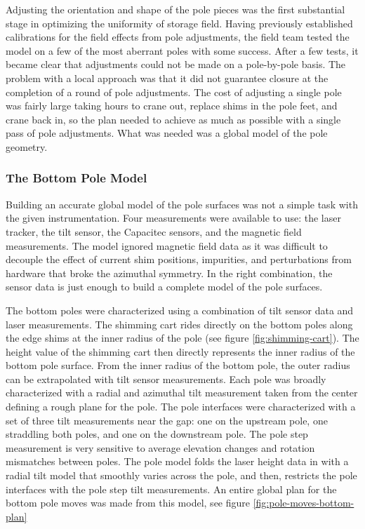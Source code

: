 Adjusting the orientation and shape of the pole pieces was the first substantial stage in optimizing the uniformity of \gmtwo storage field.  Having previously established calibrations for the field effects from pole adjustments, the \gmtwo field team tested the model on a few of the most aberrant poles with some success.  After a few tests, it became clear that adjustments could not be made on a pole-by-pole basis.  The problem with a local approach was that it did not guarantee closure at the completion of a round of pole adjustments.  The cost of adjusting a single pole was fairly large taking hours to crane out, replace shims in the pole feet, and crane back in, so the plan needed to achieve as much as possible with a single pass of pole adjustments.  What was needed was a global model of the pole geometry.

\subsubsection{The Bottom Pole Model}

Building an accurate global model of the pole surfaces was not a simple task with the given instrumentation.  Four measurements were available to use: the laser tracker, the tilt sensor, the Capacitec sensors, and the magnetic field measurements.  The model ignored magnetic field data as it was difficult to decouple the effect of current shim positions, impurities, and perturbations from hardware that broke the azimuthal symmetry.  In the right combination, the sensor data is just enough to build a complete model of the pole surfaces.

The bottom poles were characterized using a combination of tilt sensor data and laser measurements.  The shimming cart rides directly on the bottom poles along the edge shims at the inner radius of the pole (see figure \ref{fig:shimming-cart}). The height value of the shimming cart then directly represents the inner radius of the bottom pole surface.  From the inner radius of the bottom pole, the outer radius can be extrapolated with tilt sensor measurements.  Each pole was broadly characterized with a radial and azimuthal tilt measurement taken from the center defining a rough plane for the pole.  The pole interfaces were characterized with a set of three tilt measurements near the gap: one on the upstream pole, one straddling both poles, and one on the downstream pole.  The pole step measurement is very sensitive to average elevation changes and rotation mismatches between poles.  The pole model folds the laser height data in with a radial tilt model that smoothly varies across the pole, and then, restricts the pole interfaces with the pole step tilt measurements.  An entire global plan for the bottom pole moves was made from this model, see figure \ref{fig:pole-moves-bottom-plan}

